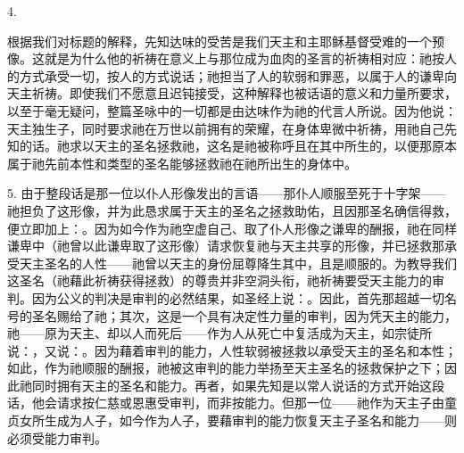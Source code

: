 4. \par

根据我们对标题的解释，先知达味的受苦是我们天主和主耶稣基督受难的一个预像。这就是为什么他的祈祷在意义上与那位成为血肉的圣言的祈祷相对应：祂按人的方式承受一切，按人的方式说话；祂担当了人的软弱和罪恶，以属于人的谦卑向天主祈祷。即使我们不愿意且迟钝接受，这种解释也被话语的意义和力量所要求，以至于毫无疑问，整篇圣咏中的一切都是由达味作为祂的代言人所说。因为他说：天主独生子，同时要求祂在万世以前拥有的荣耀，在身体卑微中祈祷，用祂自己先知的话。祂求以天主的圣名拯救祂，这名是祂被称呼且在其中所生的，以便那原本属于祂先前本性和类型的圣名能够拯救祂在祂所出生的身体中。\par

5. 由于整段话是那一位以仆人形像发出的言语——那仆人顺服至死于十字架——祂担负了这形像，并为此恳求属于天主的圣名之拯救助佑，且因那圣名确信得救，便立即加上：。因为如今作为祂空虚自己、取了仆人形像之谦卑的酬报，祂在同样谦卑中（祂曾以此谦卑取了这形像）请求恢复祂与天主共享的形像，并已拯救那承受天主圣名的人性——祂曾以天主的身份屈尊降生其中，且是顺服的。为教导我们这圣名（祂藉此祈祷获得拯救）的尊贵并非空洞头衔，祂祈祷要受天主能力的审判。因为公义的判决是审判的必然结果，如圣经上说：。因此，首先那超越一切名号的圣名赐给了祂；其次，这是一个具有决定性力量的审判，因为凭天主的能力，祂——原为天主、却以人而死后——作为人从死亡中复活成为天主，如宗徒所说：，又说：。因为藉着审判的能力，人性软弱被拯救以承受天主的圣名和本性；如此，作为祂顺服的酬报，祂被这审判的能力举扬至天主圣名的拯救保护之下；因此祂同时拥有天主的圣名和能力。再者，如果先知是以常人说话的方式开始这段话，他会请求按仁慈或恩惠受审判，而非按能力。但那一位——祂作为天主子由童贞女所生成为人子，如今作为人子，要藉审判的能力恢复天主子圣名和能力——则必须受能力审判。\par

